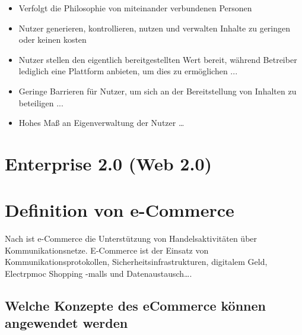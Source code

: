 \begin{itemize}
\item Verfolgt die Philosophie von miteinander verbundenen Personen \parencite[S. 8]{turban:sc}
\item Nutzer generieren, kontrollieren, nutzen und verwalten Inhalte zu geringen
oder keinen kosten \parencite[S. 8]{turban:sc}
\item Nutzer stellen den eigentlich bereitgestellten Wert bereit, während Betreiber lediglich eine Plattform anbieten, um dies zu ermöglichen ...
\item Geringe Barrieren für Nutzer, um sich an der Bereitstellung von Inhalten zu
beteiligen ...
\item Hohes Maß an Eigenverwaltung der Nutzer …
\end{itemize}


\section{Enterprise 2.0 (Web 2.0)}


\section{Definition von  e-Commerce}

Nach \textcite[S. 20]{merz:e-commerce} ist e-Commerce  \glqq die Unterstützung von Handelsaktivitäten über Kommunikationsnetze\grqq. E-Commerce ist der Einsatz von Kommunikationsprotokollen, Sicherheitsinfrastrukturen, digitalem Geld, Electrpmoc Shopping -malls und Datenaustausch….\grqq


\subsection{Welche Konzepte des eCommerce können angewendet werden}

